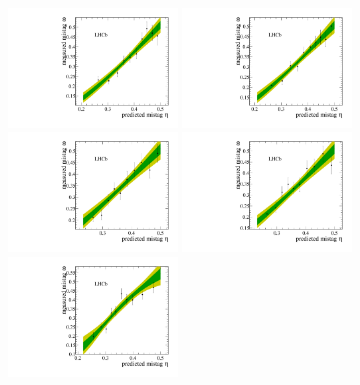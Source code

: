 \begin{figure}[t]
        \begin{center}
        \includegraphics[width=0.4\textwidth]{04Flavourtagging/figs/OSelectronOpt/RunIEval_Bu2JpsiKst/eval_on_I.pdf}
        \includegraphics[width=0.4\textwidth]{04Flavourtagging/figs/OSelectronOpt/RunIEval_Bu2JpsiKst/eval_on_II.pdf} \\
        \includegraphics[width=0.4\textwidth]{04Flavourtagging/figs/OSelectronOpt/RunIIEval_Bu2JpsiKst/eval_on_I.pdf}
        \includegraphics[width=0.4\textwidth]{04Flavourtagging/figs/OSelectronOpt/RunIIEval_Bu2JpsiKst/eval_on_II.pdf} \\
        \includegraphics[width=0.4\textwidth]{04Flavourtagging/figs/OSelectronOpt/RunIIEval_Bu2D0Pi/eval_on_I.pdf}

\end{center}
\end{figure}
